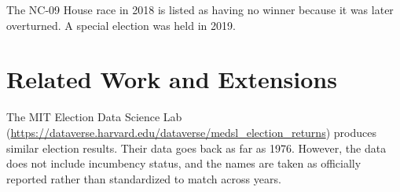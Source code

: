 \documentclass[12pt]{article}
\begin{document}
The NC-09 House race in 2018 is listed as having no winner because it was later overturned. A special election was held in 2019.





\section{Related Work and Extensions}

The MIT Election Data Science Lab (\url{https://dataverse.harvard.edu/dataverse/medsl\_election\_returns}) produces similar election results. Their data goes back as far as 1976. However, the data does not include incumbency status, and the names are taken as officially reported rather than standardized to match across years.


\end{document}
